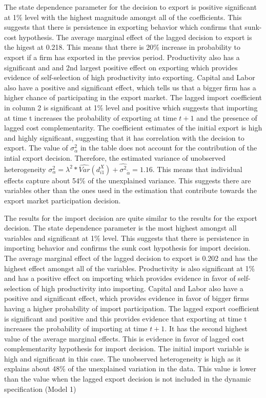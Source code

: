 \documentclass[12pt]{article}
\begin{document}
    The state dependence parameter for the decision to export is positive
  significant at 1\% level with the highest magnitude amongst all of
  the coefficients. This suggests that there is persistence in
  exporting behavior which confirms that sunk-cost hypothesis. The average marginal effect of the lagged
  decision to export is the higest at 0.218. This  means that there is 20\% increase
  in probability to export if a firm has exported in the previos
  period.  Productivity also has a significant and
  and 2nd largest positive effect on exporting which provides evidence of
  self-selection of high productivity into exporting. Capital and Labor
  also have a positive and significant effect, which tells us that a
  bigger firm has a higher chance of participating in the export
  market. The lagged import coefficient in column 2 is
  significant  at 1\% level and positive which suggests  that importing
  at time t increases the probability of exporting at time $t+1$ and
   the presence of lagged cost complementarity. The coefficient
estimates of the initial export is high and highly significant,
suggesting that it has correlation with the decision to export. The value of
  $\sigma^2_{\alpha}$ in the table does not account for the
  contribution of the intial export decision. Therefore, the estimated
  variance of 
  unobserved heterogeneity $\sigma^2_{\alpha}= \lambda^2 *
  \hat{Var}(d_{i1}^{X})+\hat{\sigma^2}_{\tilde{\alpha}}= 1.16$. This
  means that individual effects capture about 54\% of the unexplained
  variance. This suggests there are variables other than the ones used
  in the estimation that contribute towards the export market
  participation decision. 


 The results for the import decision are quite similar to the
 results for the export decision. The state dependence parameter is the most highest
  amongst all variables and
  significant at 1\% level. This suggests that there is  persistence in
  importing behavior and confirms the sunk cost hypothesis for import decision. The average marginal effect of the lagged
  decision to export is 0.202 and has the highest effect amongst all
  of the variables.  Productivity is also significant at 1\%
  and has a 
  positive effect on importing which provides evidence in favor of
  self-selection of high productivity into importing. Capital and Labor
  also have a positive and significant effect, which provides evidence
  in favor of 
  bigger firms having a higher probability of import participation.  The lagged export coefficient is
  significant and positive and this provides evidence  that exporting
  at time t increases the probability of importing at time $t+1$. It
  has the second highest value of the average marginal effects.  This
  is evidence in favor of 
  lagged cost complementarity hypothesis for
  import decision.  The initial import variable is high and
  significant in this case.  The
  unobserved heterogeneity is high as it explains about 48\% of the unexplained
  variation in the data. This value is lower than the value
  when the lagged export decision is not included in the dynamic
  specification (Model 1) 
\end{document}
